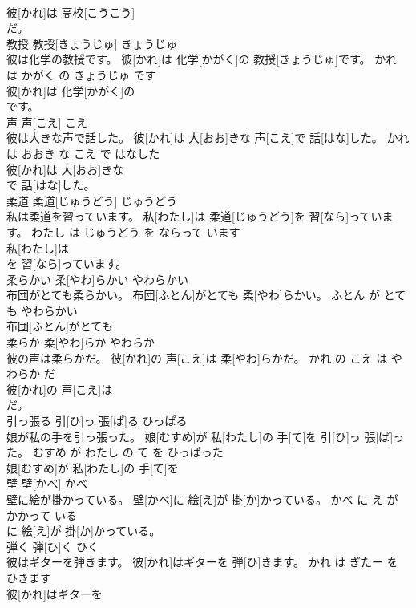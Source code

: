 \documentclass[8pt]{extreport}
\begin{document}
\begin{CJK}{UTF8}{min}
\\	彼[かれ]は 高校[こうこう]
\\	だ。			
\\	教授	教授[きょうじゅ]	きょうじゅ	
\\	彼は化学の教授です。	彼[かれ]は 化学[かがく]の 教授[きょうじゅ]です。	かれ は かがく の きょうじゅ です	
\\	彼[かれ]は 化学[かがく]の
\\	です。			
\\	声	声[こえ]	こえ	
\\	彼は大きな声で話した。	彼[かれ]は 大[おお]きな 声[こえ]で 話[はな]した。	かれ は おおき な こえ で はなした	
\\	彼[かれ]は 大[おお]きな
\\	で 話[はな]した。			
\\	柔道	柔道[じゅうどう]	じゅうどう	
\\	私は柔道を習っています。	私[わたし]は 柔道[じゅうどう]を 習[なら]っています。	わたし は じゅうどう を ならって います	
\\	私[わたし]は
\\	を 習[なら]っています。			
\\	柔らかい	柔[やわ]らかい	やわらかい	
\\	布団がとても柔らかい。	布団[ふとん]がとても 柔[やわ]らかい。	ふとん が とても やわらかい	
\\	布団[ふとん]がとても
\\	柔らか	柔[やわ]らか	やわらか	
\\	彼の声は柔らかだ。	彼[かれ]の 声[こえ]は 柔[やわ]らかだ。	かれ の こえ は やわらか だ	
\\	彼[かれ]の 声[こえ]は
\\	だ。			
\\	引っ張る	引[ひ]っ 張[ぱ]る	ひっぱる	
\\	娘が私の手を引っ張った。	娘[むすめ]が 私[わたし]の 手[て]を 引[ひ]っ 張[ぱ]った。	むすめ が わたし の て を ひっぱった	
\\	娘[むすめ]が 私[わたし]の 手[て]を
\\	壁	壁[かべ]	かべ	
\\	壁に絵が掛かっている。	壁[かべ]に 絵[え]が 掛[か]かっている。	かべ に え が かかって いる	
\\	に 絵[え]が 掛[か]かっている。			
\\	弾く	弾[ひ]く	ひく	
\\	彼はギターを弾きます。	彼[かれ]はギターを 弾[ひ]きます。	かれ は ぎたー を ひきます	
\\	彼[かれ]はギターを

\end{CJK}
\end{document}
